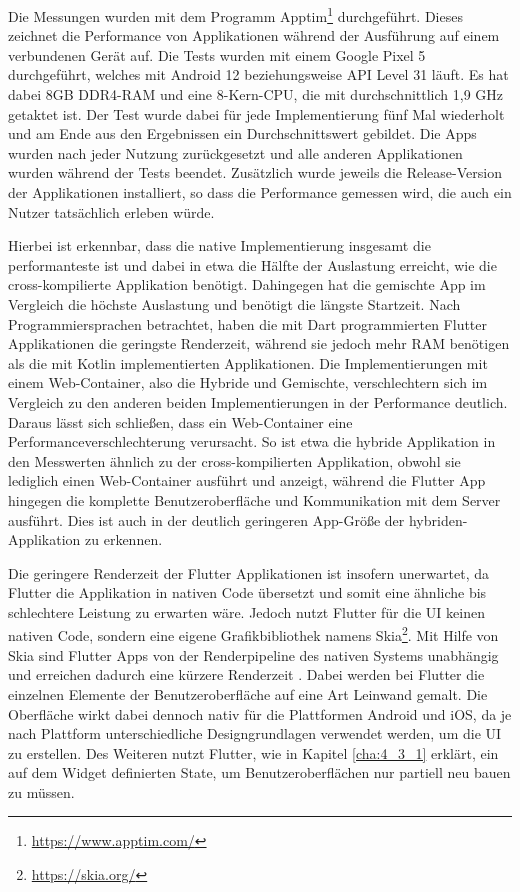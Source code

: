Die Messungen wurden mit dem Programm Apptim\footnote{\url{https://www.apptim.com/}} durchgeführt. Dieses zeichnet die Performance von Applikationen während der Ausführung auf einem verbundenen Gerät auf. Die Tests wurden mit einem Google Pixel 5 durchgeführt, welches mit Android 12 beziehungsweise API Level 31 läuft. Es hat dabei 8GB DDR4-RAM und eine 8-Kern-CPU, die mit durchschnittlich 1,9 GHz getaktet ist.
Der Test wurde dabei für jede Implementierung fünf Mal wiederholt und am Ende aus den Ergebnissen ein Durchschnittswert gebildet.
Die Apps wurden nach jeder Nutzung zurückgesetzt und alle anderen Applikationen wurden während der Tests beendet.
Zusätzlich wurde jeweils die Release-Version der Applikationen installiert, so dass die Performance gemessen wird, die auch ein Nutzer tatsächlich erleben würde.

Hierbei ist erkennbar, dass die native Implementierung insgesamt die performanteste ist und dabei in etwa die Hälfte der Auslastung erreicht, wie die cross-kompilierte Applikation benötigt.
Dahingegen hat die gemischte App im Vergleich die höchste Auslastung und benötigt die längste Startzeit.
Nach Programmiersprachen betrachtet, haben die mit Dart programmierten Flutter Applikationen die geringste Renderzeit, während sie jedoch mehr RAM benötigen als die mit Kotlin implementierten Applikationen.
Die Implementierungen mit einem Web-Container, also die Hybride und Gemischte, verschlechtern sich im Vergleich zu den anderen beiden Implementierungen in der Performance deutlich. Daraus lässt sich schließen, dass ein Web-Container eine Performanceverschlechterung verursacht. So ist etwa die hybride Applikation in den Messwerten ähnlich zu der cross-kompilierten Applikation, obwohl sie lediglich einen Web-Container ausführt und anzeigt, während die Flutter App hingegen die komplette Benutzeroberfläche und Kommunikation mit dem Server ausführt. Dies ist auch in der deutlich geringeren App-Größe der hybriden-Applikation zu erkennen.  

Die geringere Renderzeit der Flutter Applikationen ist insofern unerwartet, da Flutter die Applikation in nativen Code übersetzt und somit eine ähnliche bis schlechtere Leistung zu erwarten wäre. Jedoch nutzt Flutter für die UI keinen nativen Code, sondern eine eigene Grafikbibliothek namens Skia\footnote{\url{https://skia.org/}}. Mit Hilfe von Skia sind Flutter Apps von der Renderpipeline des nativen Systems unabhängig und erreichen dadurch eine kürzere Renderzeit \cite{Thiele_2018}. Dabei werden bei Flutter die einzelnen Elemente der Benutzeroberfläche auf eine Art Leinwand gemalt. Die Oberfläche wirkt dabei dennoch nativ für die Plattformen Android und iOS, da je nach Plattform unterschiedliche Designgrundlagen verwendet werden, um die UI zu erstellen\cite{jose_flutter}. Des Weiteren nutzt Flutter, wie in Kapitel \ref{cha:4_3_1} erklärt, ein auf dem Widget definierten State, um Benutzeroberflächen nur partiell neu bauen zu müssen.

